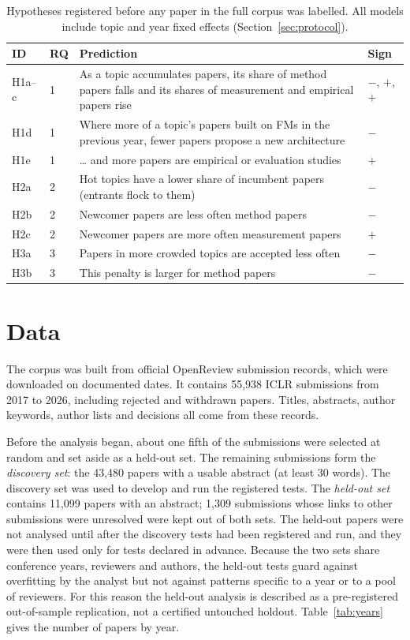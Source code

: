 \begin{table}[tb]
\centering
\footnotesize
\setlength{\tabcolsep}{4pt}
\renewcommand{\arraystretch}{1.1}
\begin{tabularx}{\textwidth}{@{}l l Y l@{}}
\toprule
ID & RQ & Prediction & Sign \\
\midrule
H1a--c & 1 & As a topic accumulates papers, its share of method papers falls and its shares of measurement and empirical
papers rise & $-$, $+$, $+$ \\
H1d & 1 & Where more of a topic's papers built on FMs in the previous year, fewer papers propose a new architecture &
$-$ \\
H1e & 1 & \ldots{} and more papers are empirical or evaluation studies & $+$ \\
\addlinespace
H2a & 2 & Hot topics have a lower share of incumbent papers (entrants flock to them) & $-$ \\
H2b & 2 & Newcomer papers are less often method papers & $-$ \\
H2c & 2 & Newcomer papers are more often measurement papers & $+$ \\
\addlinespace
H3a & 3 & Papers in more crowded topics are accepted less often & $-$ \\
H3b & 3 & This penalty is larger for method papers & $-$ \\
\bottomrule
\end{tabularx}
\caption[Registered hypotheses]{Hypotheses registered before any paper in the full corpus was labelled. All models
include topic and year fixed effects (Section~\ref{sec:protocol}).}
\label{tab:registered}
\end{table}

\section{Data}
\label{sec:data}

The corpus was built from official OpenReview submission records, which were downloaded on documented dates. It
contains 55,938 ICLR submissions from 2017 to 2026, including rejected and withdrawn papers. Titles, abstracts,
author keywords, author lists and decisions all come from these records.

Before the analysis began, about one fifth of the submissions were selected at random and set aside as a held-out
set. The remaining submissions form the \emph{discovery set}: the 43,480 papers with a usable abstract (at least 30
words). The discovery set was used to develop and run the registered tests. The \emph{held-out set} contains 11,099
papers with an abstract; 1,309 submissions whose links to other submissions were unresolved were kept out of both sets.
The held-out papers were not analysed until after the discovery tests had been registered and run, and they were then
used only for tests declared in advance. Because the two sets share conference years, reviewers and authors, the
held-out tests guard against overfitting by the analyst but not against patterns specific to a year or to a pool of
reviewers. For this reason the held-out analysis is described as a pre-registered out-of-sample replication, not a
certified untouched holdout. Table~\ref{tab:years} gives the number of papers by year.

